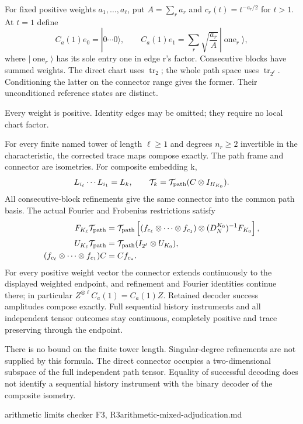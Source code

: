 \begin{definition}
For fixed positive weights $a_1,\ldots,a_\ell$, put $A=\sum_ra_r$ and
$c_r(t)=t^{-a_r/2}$ for $t>1$. At $t=1$ define
\[
 C_a(1)e_0=|0\cdots0\rangle,\qquad
 C_a(1)e_1=\sum_r\sqrt{\frac{a_r}{A}}\,|\operatorname{one}_r\rangle,
\]
where $|\operatorname{one}_r\rangle$ has its sole entry one in edge r's
factor. Consecutive blocks have summed weights. The direct chart uses
$\operatorname{tr}_2$; the whole path space uses
$\operatorname{tr}_{2^\ell}$. Conditioning the latter on the connector
range gives the former. Their unconditioned reference states are distinct.
\end{definition}
\begin{scope}
Every weight is positive. Identity edges may be omitted; they require
no local chart factor.
\end{scope}

\begin{proposition}
\statusProved\quad
For every finite named tower of length $\ell\geq1$ and degrees
$n_r\geq2$ invertible in the characteristic, the corrected trace maps
compose exactly. The path
frame and connector are isometries. For composite embedding k,
\[
 L_{i_\ell}\cdots L_{i_1}=L_k,\qquad
 \mathcal T_k=\mathcal T_{\rm path}(C\otimes I_{H_{K_0}}).
\]
All consecutive-block refinements give the same connector into the common
path basis. The actual Fourier and Frobenius restrictions satisfy
\begin{align*}
 F_{K_\ell}\mathcal T_{\rm path}
 &=\mathcal T_{\rm path}\left[
 (f_{c_\ell}\otimes\cdots\otimes f_{c_1})
 \otimes (D_N^{K_0})^{-1}F_{K_0}\right],\\
 U_{K_\ell}\mathcal T_{\rm path}
 &=\mathcal T_{\rm path}(I_{2^\ell}\otimes U_{K_0}),\\
 (f_{c_\ell}\otimes\cdots\otimes f_{c_1})C&=Cf_{c_*}.
\end{align*}
For every positive weight vector the connector extends continuously to
the displayed weighted endpoint, and refinement and Fourier identities
continue there; in particular $Z^{\otimes\ell}C_a(1)=C_a(1)Z$.
Retained decoder success amplitudes compose exactly. Full sequential
history instruments and all independent tensor outcomes stay continuous,
completely positive and trace preserving through the endpoint.
\end{proposition}
\begin{scope}
There is no bound on the finite tower length. Singular-degree refinements
are not supplied by this formula. The direct connector occupies a
two-dimensional subspace of the full independent path tensor. Equality of
successful decoding does not identify a sequential history instrument with
the binary decoder of the composite isometry.
\end{scope}
{arithmetic limits checker F3, R3}{arithmetic-mixed-adjudication.md}

